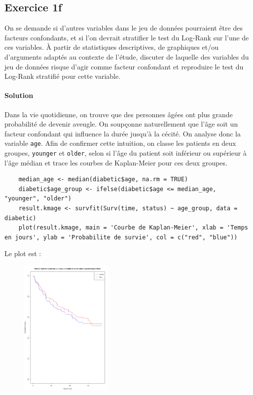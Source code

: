 \documentclass[../main.tex]{subfiles}
\begin{document}
\begin{CJK*}{UTF8}{gbsn}

\section*{Exercice 1f}
On se demande si d'autres variables
dans le jeu de données pourraient être des facteurs confondants, et si l'on devrait stratifier le
test du Log-Rank sur l'une de ces variables. À partir de statistiques descriptives, de graphiques
et/ou d'arguments adaptés au contexte de l'étude, discuter de laquelle des variables du jeu de
données risque d'agir comme facteur confondant et reproduire le test du Log-Rank stratifié pour cette variable.
    
\paragraph{Solution}
Dans la vie quotidienne, on trouve que des personnes 
âgées ont plus grande probabilité de devenir aveugle. 
On soupçonne naturellement que l'âge
soit un facteur confondant qui influence la durée jusqu'à la cécité.
On analyse donc la variable \texttt{age}. 
Afin de confirmer cette intuition,
on classe les patients en deux groupes, \texttt{younger} et \texttt{older},
selon si l'âge du patient soit inférieur ou supérieur à l'âge médian
et trace les courbes de Kaplan-Meier pour ces deux groupes. 

\begin{lstlisting}
    median_age <- median(diabetic$age, na.rm = TRUE)
    diabetic$age_group <- ifelse(diabetic$age <= median_age, "younger", "older")
    result.kmage <- survfit(Surv(time, status) ~ age_group, data = diabetic)
    plot(result.kmage, main = 'Courbe de Kaplan-Meier', xlab = 'Temps en jours', ylab = 'Probabilite de survie', col = c("red", "blue"))
\end{lstlisting}

Le plot est :

\begin{figure}[H]
    \centering
    \includegraphics[width=0.4\textwidth]{1f.png}
    \label{fig:mesh1}
\end{figure}


\end{CJK*}
\end{document}
